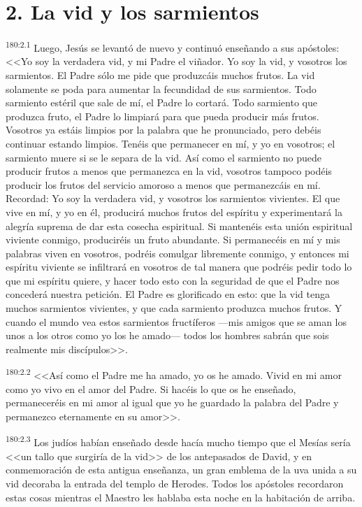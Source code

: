 \section*{2. La vid y los sarmientos}
\par 
\textsuperscript{180:2.1} Luego, Jesús se levantó de nuevo y continuó enseñando a sus apóstoles: <<Yo soy la verdadera vid, y mi Padre el viñador. Yo soy la vid, y vosotros los sarmientos. El Padre sólo me pide que produzcáis muchos frutos. La vid solamente se poda para aumentar la fecundidad de sus sarmientos. Todo sarmiento estéril que sale de mí, el Padre lo cortará. Todo sarmiento que produzca fruto, el Padre lo limpiará para que pueda producir más frutos. Vosotros ya estáis limpios por la palabra que he pronunciado, pero debéis continuar estando limpios. Tenéis que permanecer en mí, y yo en vosotros; el sarmiento muere si se le separa de la vid. Así como el sarmiento no puede producir frutos a menos que permanezca en la vid, vosotros tampoco podéis producir los frutos del servicio amoroso a menos que permanezcáis en mí. Recordad: Yo soy la verdadera vid, y vosotros los sarmientos vivientes. El que vive en mí, y yo en él, producirá muchos frutos del espíritu y experimentará la alegría suprema de dar esta cosecha espiritual. Si mantenéis esta unión espiritual viviente conmigo, produciréis un fruto abundante. Si permanecéis en mí y mis palabras viven en vosotros, podréis comulgar libremente conmigo, y entonces mi espíritu viviente se infiltrará en vosotros de tal manera que podréis pedir todo lo que mi espíritu quiere, y hacer todo esto con la seguridad de que el Padre nos concederá nuestra petición. El Padre es glorificado en esto: que la vid tenga muchos sarmientos vivientes, y que cada sarmiento produzca muchos frutos. Y cuando el mundo vea estos sarmientos fructíferos ---mis amigos que se aman los unos a los otros como yo los he amado--- todos los hombres sabrán que sois realmente mis discípulos>>.

\par 
\textsuperscript{180:2.2} <<Así como el Padre me ha amado, yo os he amado. Vivid en mi amor como yo vivo en el amor del Padre. Si hacéis lo que os he enseñado, permaneceréis en mi amor al igual que yo he guardado la palabra del Padre y permanezco eternamente en su amor>>.

\par 
\textsuperscript{180:2.3} Los judíos habían enseñado desde hacía mucho tiempo que el Mesías sería <<un tallo que surgiría de la vid>> de los antepasados de David, y en conmemoración de esta antigua enseñanza, un gran emblema de la uva unida a su vid decoraba la entrada del templo de Herodes. Todos los apóstoles recordaron estas cosas mientras el Maestro les hablaba esta noche en la habitación de arriba.

